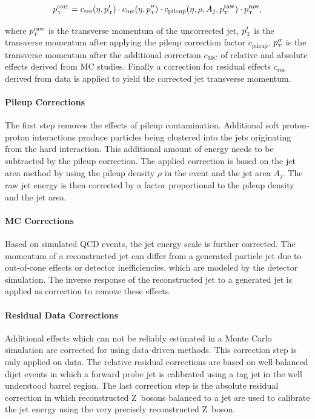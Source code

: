 \begin{equation*}
    \pt^{\mathrm{corr}} = c_{\mathrm{res}} (\eta, \pt^{\prime}) \cdot c_{\mathrm{mc}}
    (\eta, \pt^{\prime\prime}) \cdot c_{\mathrm{pileup}}(\eta, \rho, A_j,
    \pt^{\mathrm{raw}}) \cdot \pt^{\mathrm{raw}},
\end{equation*}


where $\pt^{\mathrm{raw}}$ is the transverse momentum of the uncorrected jet,
$\pt^{\prime}$ is the transverse momentum after applying the pileup correction
factor $c_{\mathrm{pileup}}$. $\pt^{\prime\prime}$ is the transverse momentum
after the additional correction $c_\mathrm{MC}$ of relative and absolute effects
derived from MC studies. Finally a correction for residual effects
$c_{\mathrm{res}}$ derived from data is applied to yield the corrected jet
transverse momentum.

\paragraph{Pileup Corrections}
\label{pileup_correction}

The first step removes the effects of pileup contamination. Additional soft
proton-proton interactions produce particles being clustered into the jets
originating from the hard interaction. This additional amount of energy needs to
be subtracted by the pileup correction. The applied correction is based on the
jet area method by using the pileup density $\rho$ in the event and the jet
area $A_j$. The raw jet energy is then corrected by a factor proportional to the
pileup density and the jet area.

\paragraph{MC Corrections}

Based on simulated QCD events, the jet energy scale is further corrected. The
momentum of a reconstructed jet can differ from a generated particle jet due to
out-of-cone effects or detector inefficiencies, which are modeled by the detector
simulation. The inverse response of the reconstructed jet to a generated jet is
applied as correction to remove these effects.

\paragraph{Residual Data Corrections}

Additional effects which can not be reliably estimated in a Monte Carlo
simulation are corrected for using data-driven methods. This correction step is
only applied on data. The relative residual corrections are based on
well-balanced dijet events in which a forward probe jet is calibrated using a
tag jet in the well understood barrel region. The last correction step is the
absolute residual correction in which reconstructed Z~bosons balanced to a jet
are used to calibrate the jet energy using the very precisely reconstructed Z~boson.
